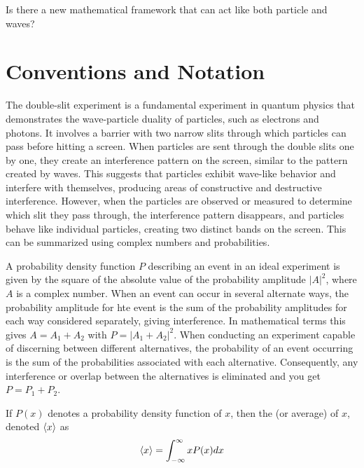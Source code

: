 \begin{questions}
	\item Is there a new mathematical framework that can act like both particle and waves?
\end{questions}




\section{Conventions and Notation}

The double-slit experiment is a fundamental experiment in quantum physics that demonstrates the wave-particle duality of particles, such as electrons and photons. It involves a barrier with two narrow slits through which particles can pass before hitting a screen. When particles are sent through the double slits one by one, they create an interference pattern on the screen, similar to the pattern created by waves. This suggests that particles exhibit wave-like behavior and interfere with themselves, producing areas of constructive and destructive interference. However, when the particles are observed or measured to determine which slit they pass through, the interference pattern disappears, and particles behave like individual particles, creating two distinct bands on the screen. This can be summarized using complex numbers and probabilities.

A probability density function $P$ describing an event in an ideal experiment is given by the square of the absolute value of the probability amplitude $|A|^2$, where $A$ is a complex number. When an event can occur in several alternate ways, the probability amplitude for hte event is the sum of the probability amplitudes for each way considered separately, giving interference. In mathematical terms this gives $A=A_1+A_2$ with $P=|A_1+A_2|^2$. When conducting an experiment capable of discerning between different alternatives, the probability of an event occurring is the sum of the probabilities associated with each alternative. Consequently, any interference or overlap between the alternatives is eliminated and you get $P=P_1+P_2$.

\begin{defn}{1}
	If $P(x)$ denotes a probability density function of $x$, then the  (or average) of $x$, denoted $\braket{x}$ as
	\begin{align}
		\braket{x} = \int_{-\infty}^{\infty}xP(x) dx \label{expectation Value equation}
	\end{align}
\end{defn}













